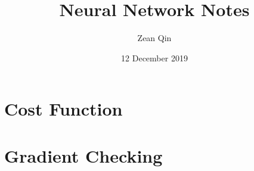 \documentclass[10pt]{article}
\title{Neural Network Notes}
\author{Zean Qin}
\date{12 December 2019}
\begin{document}
\maketitle
\tableofcontents


\section{Cost Function}




\section{Gradient Checking}
\end{document}
